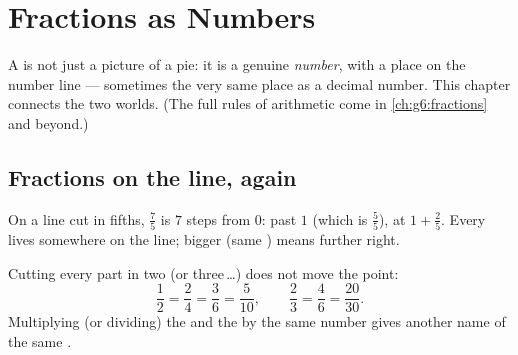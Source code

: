 \chapter{Fractions as Numbers}\label{ch:g5:fractions}

A  is not just a picture of a pie: it is a genuine
\emph{number}, with a place on the number line --- sometimes the very
same place as a decimal number. This chapter connects the two
worlds. (The full rules of  arithmetic come in
\cref{ch:g6:fractions} and beyond.)

\section{Fractions on the line, again}

\begin{example}\label{ex:g5:fractions:place}
On a line cut in fifths, $\frac{7}{5}$ is $7$ steps from $0$: past
$1$ (which is $\frac55$), at $1 + \frac25$. Every  lives
somewhere on the line; bigger  (same ) means
further right.
\end{example}

\begin{proposition}\label{prop:g5:fractions:equal}
Cutting every part in two (or three\,\dots) does not move the
point:
\[
\frac{1}{2} = \frac{2}{4} = \frac{3}{6} = \frac{5}{10},
\qquad
\frac{2}{3} = \frac{4}{6} = \frac{20}{30}.
\]
Multiplying (or dividing) the  and the  by the
same number gives another name of the same .
\end{proposition}
\admitted

